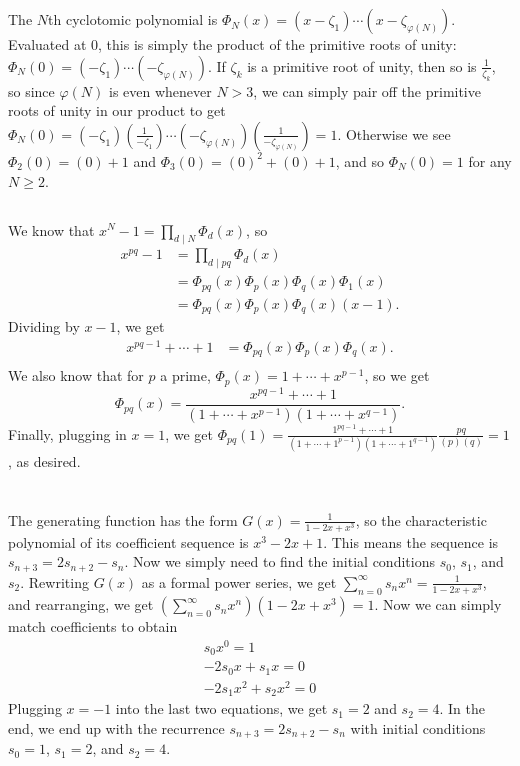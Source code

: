 \documentclass[11pt]{article}
\begin{document}
\section{} %
\subsection{} %
The $N$th cyclotomic polynomial is $\Phi_N(x)=(x-\zeta_1)\cdots(x-\zeta_{\varphi(N)})$.
Evaluated at 0, this is simply the product of the primitive roots of unity:
$\Phi_N(0)=(-\zeta_1)\cdots(-\zeta_{\varphi(N)})$.
If $\zeta_k$ is a primitive root of unity, then so is $\frac{1}{\zeta_k}$, so since $\varphi(N)$ is even whenever $N>3$, we can simply pair off the primitive roots of unity in our product to get
$\Phi_N(0)=(-\zeta_1)(\frac{1}{-\zeta_1})\cdots(-\zeta_{\varphi(N)})(\frac{1}{-\zeta_{\varphi(N)}})=1$.
Otherwise we see $\Phi_2(0)=(0)+1$ and $\Phi_3(0)=(0)^2+(0)+1$, and so $\Phi_N(0)=1$ for any $N\ge2$.


\subsection{} %
We know that $x^N-1=\prod_{d\mid N}\Phi_d(x)$, so
\begin{align*}
	x^{pq}-1&=\prod_{d\mid pq}\Phi_d(x)\\
			&=\Phi_{pq}(x)\Phi_p(x)\Phi_q(x)\Phi_1(x)\\
			&=\Phi_{pq}(x)\Phi_p(x)\Phi_q(x)(x-1).
\end{align*}
Dividing by $x-1$, we get
\begin{align*}
	x^{pq-1}+\cdots+1&=\Phi_{pq}(x)\Phi_p(x)\Phi_q(x).\\
\end{align*}
We also know that for $p$ a prime, $\Phi_p(x)=1+\cdots+x^{p-1}$, so we get
\[\Phi_{pq}(x)=\frac{x^{pq-1}+\cdots+1}{(1+\cdots+x^{p-1})(1+\cdots+x^{q-1})}.\]
Finally, plugging in $x=1$, we get $\Phi_{pq}(1)=\frac{1^{pq-1}+\cdots+1}{(1+\cdots+1^{p-1})(1+\cdots+1^{q-1})}\frac{pq}{(p)(q)}=1$, as desired.


\section{} %
The generating function has the form $G(x)=\frac{1}{1-2x+x^3}$, so the characteristic polynomial of its coefficient sequence is $x^3-2x+1$.
This means the sequence is $s_{n+3}=2s_{n+2}-s_n$.
Now we simply need to find the initial conditions $s_0$, $s_1$, and $s_2$.
Rewriting $G(x)$ as a formal power series, we get $\sum_{n=0}^\infty s_nx^n=\frac{1}{1-2x+x^3}$, and rearranging, we get $(\sum_{n=0}^\infty s_nx^n)(1-2x+x^3)=1$.
Now we can simply match coefficients to obtain
\begin{align*}
	s_0x^0=1\\
	-2s_0x+s_1x=0\\
	-2s_1x^2+s_2x^2=0
\end{align*}
Plugging $x=-1$ into the last two equations, we get $s_1=2$ and $s_2=4$.
In the end, we end up with the recurrence $s_{n+3}=2s_{n+2}-s_n$ with initial conditions $s_0=1$, $s_1=2$, and $s_2=4$.
\end{document}
